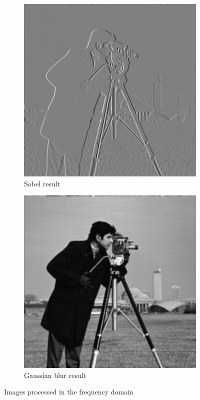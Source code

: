 \documentclass[]{article}
\begin{document}
\begin{figure}[H]
     \centering
     \begin{subfigure}[b]{0.45\textwidth}
         \centering
         \includegraphics[width=\textwidth]{camera_sobelx}
         \caption{Sobel result}
         \label{fig:sobel_after}
     \end{subfigure}
     \hfill
     \begin{subfigure}[b]{0.45\textwidth}
         \centering
         \includegraphics[width=\textwidth]{camera_gaussian}
         \caption{Gaussian blur result}
         \label{fig:gauss_after}
     \end{subfigure}
    \caption{Images processed in the frequency domain}
    \label{fig:processed_freq}
\end{figure}
\end{document}
